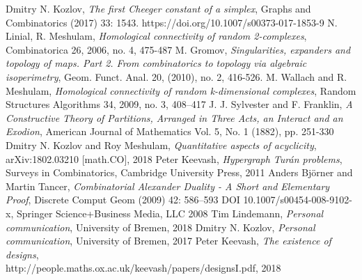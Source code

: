 \documentclass[11pt,english,onehalfspacing,headsepline]{MastersDoctoralThesis}
\begin{document}

\appendix %


%



\begin{thebibliography}{1}
Dmitry N. Kozlov, \textit{The first Cheeger constant of a simplex}, Graphs and Combinatorics (2017) 33: 1543. https://doi.org/10.1007/s00373-017-1853-9
N. Linial, R. Meshulam, \textit{Homological connectivity of random 2-complexes}, Combinatorica 26, 2006,
no. 4, 475-487
M. Gromov, \textit{Singularities, expanders and topology of maps. Part 2. From combinatorics to topology
via algebraic isoperimetry}, Geom. Funct. Anal. 20, (2010), no. 2, 416-526.
M. Wallach and R. Meshulam, \textit{Homological connectivity of random k-dimensional complexes}, Random Structures Algorithms 34, 2009, no. 3, 408–417
J. J. Sylvester and F. Franklin, \textit{A Constructive Theory of Partitions, Arranged in Three Acts, an Interact and an Exodion}, American Journal of Mathematics
Vol. 5, No. 1 (1882), pp. 251-330
 Dmitry N. Kozlov and Roy Meshulam, \textit{Quantitative aspects of acyclicity}, arXiv:1802.03210 [math.CO], 2018
 Peter Keevash, \textit{Hypergraph Tur\'{a}n problems}, Surveys in Combinatorics, Cambridge University Press, 2011
 Anders Björner and Martin Tancer, \textit{Combinatorial Alexander Duality - A Short and Elementary Proof}, Discrete Comput Geom (2009) 42: 586–593 DOI 10.1007/s00454-008-9102-x, Springer Science+Business Media, LLC 2008
 Tim Lindemann, \textit{Personal communication}, University of Bremen, 2018
 Dmitry N. Kozlov, \textit{Personal communication}, University of Bremen, 2017
 Peter Keevash, \textit{The existence of designs},\\http://people.maths.ox.ac.uk/keevash/papers/designsI.pdf, 2018
\end{thebibliography}
\end{document}
